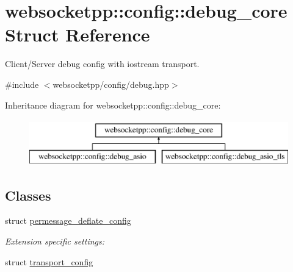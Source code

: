 \hypertarget{structwebsocketpp_1_1config_1_1debug__core}{}\section{websocketpp\+:\+:config\+:\+:debug\+\_\+core Struct Reference}
\label{structwebsocketpp_1_1config_1_1debug__core}


Client/\+Server debug config with iostream transport.  




{\ttfamily \#include $<$websocketpp/config/debug.\+hpp$>$}

Inheritance diagram for websocketpp\+:\+:config\+:\+:debug\+\_\+core\+:\begin{figure}[H]
\begin{center}
\leavevmode
\includegraphics[height=2.000000cm]{structwebsocketpp_1_1config_1_1debug__core}
\end{center}
\end{figure}
\subsection*{Classes}
\begin{DoxyCompactItemize}
\item 
struct \hyperlink{structwebsocketpp_1_1config_1_1debug__core_1_1permessage__deflate__config}{permessage\+\_\+deflate\+\_\+config}
\begin{DoxyCompactList}\small\item\em Extension specific settings\+: \end{DoxyCompactList}\item 
struct \hyperlink{structwebsocketpp_1_1config_1_1debug__core_1_1transport__config}{transport\+\_\+config}
\end{DoxyCompactItemize}
